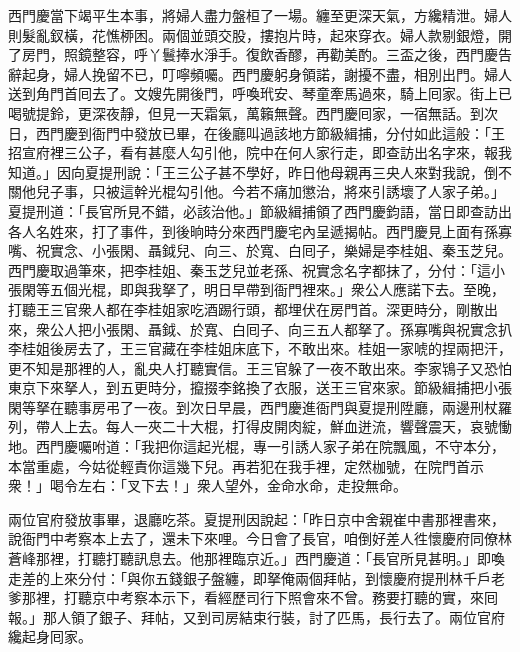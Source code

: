 西門慶當下竭平生本事，將婦人盡力盤桓了一場。纏至更深天氣，方纔精泄。婦人則髮亂釵橫，花憔桺困。兩個並頭交股，摟抱片時，起來穿衣。婦人款剔銀燈，開了房門，照鏡整容，呼丫鬟捧水淨手。復飲香醪，再勸美酌。三盃之後，西門慶告辭起身，婦人挽留不已，叮嚀頻囑。西門慶躬身領諾，謝擾不盡，相別出門。婦人送到角門首囘去了。文嫂先開後門，呼喚玳安、琴童牽馬過來，騎上囘家。街上已喝號提鈴，更深夜靜，但見一天霜氣，萬籟無聲。西門慶囘家，一宿無話。到次日，西門慶到衙門中發放已畢，在後廳叫過該地方節級緝捕，分付如此這般：「王招宣府裡三公子，看有甚麼人勾引他，院中在何人家行走，即查訪出名字來，報我知道。」因向夏提刑說：「王三公子甚不學好，昨日他母親再三央人來對我說，倒不關他兒子事，只被這幹光棍勾引他。今若不痛加懲治，將來引誘壞了人家子弟。」夏提刑道：「長官所見不錯，必該治他。」節級緝捕領了西門慶鈞語，當日即查訪出各人名姓來，打了事件，到後晌時分來西門慶宅內呈遞揭帖。西門慶見上面有孫寡嘴、祝實念、小張閑、聶鉞兒、向三、於寬、白囘子，樂婦是李桂姐、秦玉芝兒。西門慶取過筆來，把李桂姐、秦玉芝兒並老孫、祝實念名字都抹了，分付：「這小張閑等五個光棍，即與我拏了，明日早帶到衙門裡來。」衆公人應諾下去。至晚，打聽王三官衆人都在李桂姐家吃酒踢行頭，都埋伏在房門首。深更時分，剛散出來，衆公人把小張閑、聶鉞、於寬、白囘子、向三五人都拏了。孫寡嘴與祝實念扒李桂姐後房去了，王三官藏在李桂姐床底下，不敢出來。桂姐一家唬的捏兩把汗，更不知是那裡的人，亂央人打聽實信。王三官躲了一夜不敢出來。李家鴇子又恐怕東京下來拏人，到五更時分，攛掇李銘換了衣服，送王三官來家。節級緝捕把小張閑等拏在聽事房弔了一夜。到次日早晨，西門慶進衙門與夏提刑陞廳，兩邊刑杖羅列，帶人上去。每人一夾二十大棍，打得皮開肉綻，鮮血迸流，響聲震天，哀號慟地。西門慶囑咐道：「我把你這起光棍，專一引誘人家子弟在院飄風，不守本分，本當重處，今姑從輕責你這幾下兒。再若犯在我手裡，定然枷號，在院門首示衆！」喝令左右：「叉下去！」衆人望外，金命水命，走投無命。

兩位官府發放事畢，退廳吃茶。夏提刑因說起：「昨日京中舍親崔中書那裡書來，說衙門中考察本上去了，還未下來哩。今日會了長官，咱倒好差人徃懷慶府同僚林蒼峰那裡，打聽打聽訊息去。他那裡臨京近。」西門慶道：「長官所見甚明。」即喚走差的上來分付：「與你五錢銀子盤纏，即拏俺兩個拜帖，到懷慶府提刑林千戶老爹那裡，打聽京中考察本示下，看經歷司行下照會來不曾。務要打聽的實，來囘報。」那人領了銀子、拜帖，又到司房結束行裝，討了匹馬，長行去了。兩位官府纔起身囘家。

